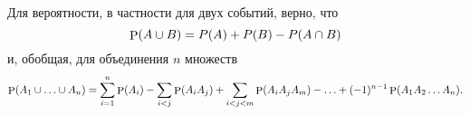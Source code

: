 \begin{to_thr}
    Для вероятности, в частности для двух событий, верно, что
    \begin{equation*}
        \P (A \cup B) = P(A) + P(B) - P(A\cap B)
    \end{equation*}
    и, обобщая, для объединения $n$ множеств
    \begin{equation*}
        \P(A_1 \cup \ldots \cup A_n) = \sum_{i=1}^{n} \P(A_i) - \sum_{i < j} \P (A_i A_j) + 
        \sum_{i < j < m} \P(A_i A_j A_m) - \ldots + (-1)^{n-1} \P(A_1 A_2 \ldots A_n).
    \end{equation*}
\end{to_thr}

